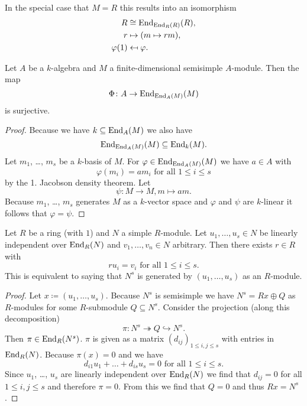 \begin{rem}
 In the special case that $M = R$ this results into an isomorphism
 \begin{align*}
  R          &\cong \operatorname{End}_{\operatorname{End}_R(R)}(R), \\
  r          &\mapsto (m \mapsto rm), \\
  \varphi(1) &\mapsfrom \varphi.
 \end{align*}
\end{rem}


\begin{cor}
 Let $A$ be a $k$-algebra and $M$ a finite-dimensional semisimple $A$-module. Then the map
 \[
  \Phi \colon A \to \operatorname{End}_{\operatorname{End}_A(M)}(M)
 \]
 is surjective.
\end{cor}
\begin{proof}
 Because we have $k \subseteq \operatorname{End}_A(M)$ we also have
 \[
  \operatorname{End}_{\operatorname{End}_A(M)}(M) \subseteq \operatorname{End}_k(M).
 \]
 Let $m_1$, \dots, $m_s$ be a $k$-basis of $M$. For $\varphi \in \operatorname{End}_{\operatorname{End}_A(M)}(M)$ we have $a \in A$ with
 \[
  \varphi(m_i) = a m_i \text{ for all } 1 \leq i \leq s
 \]
 by the 1. Jacobson density theorem. Let
 \[
  \psi \colon M \to M, m \mapsto am.
 \]
 Because $m_1$, \dots, $m_s$ generates $M$ as a $k$-vector space and $\varphi$ and $\psi$ are $k$-linear it follows that $\varphi = \psi$.
\end{proof}


\begin{thrm}
 Let $R$ be a ring (with $1$) and $N$ a simple $R$-module. Let $u_1, \dotsc, u_s \in N$ be linearly independent over $\operatorname{End}_R(N)$ and $v_1, \dotsc, v_n \in N$ arbitrary. Then there exists $r \in R$ with
 \[
  r u_i = v_i \text{ for all } 1 \leq i \leq s.
 \]
 This is equivalent to saying that $N^s$ is generated by $(u_1, \dotsc, u_s)$ as an $R$-module.
\end{thrm}


\begin{proof}
 Let $x \coloneqq (u_1, \dotsc, u_s)$. Because $N^s$ is semisimple we have $N^s = Rx \oplus Q$ as $R$-modules for some $R$-submodule $Q \subseteq N^s$. Consider the projection (along this decomposition)
 \[
  \pi \colon N^s \twoheadrightarrow Q \hookrightarrow N^s.
 \]
 Then $\pi \in \operatorname{End}_R(N^s)$. $\pi$ is given as a matrix $(d_{ij})_{1 \leq i,j \leq s}$ with entries in $\operatorname{End}_R(N)$. Because $\pi(x) = 0$ and we have
 \[
  d_{i1} u_1 + \dotsc + d_{is} u_s = 0 \text{ for all } 1 \leq i \leq s.
 \]
 Since $u_1$, \dots, $u_s$ are linearly independent over $\operatorname{End}_R(N)$ we find that $d_{ij} = 0$ for all $1 \leq i,j \leq s$ and therefore $\pi = 0$. From this we find that $Q = 0$ and thus $Rx = N^s$.
\end{proof}


